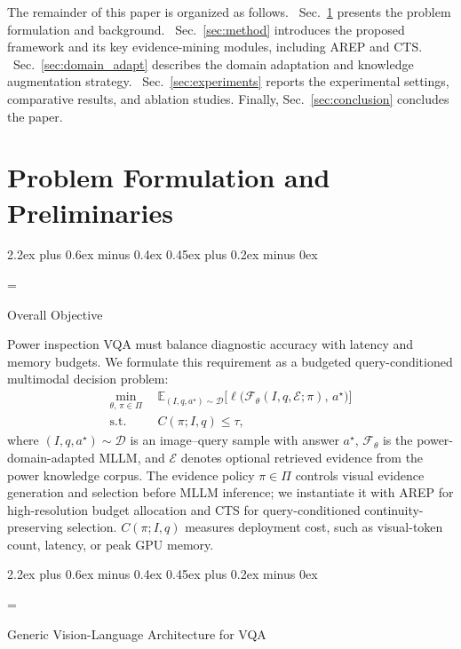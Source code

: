 \documentclass[journal,twoside,web]{ieeecolor}
\makeatletter
\renewcommand{\subsection}{\@startsection{subsection}{2}{\z@}%
  {2.2ex plus 0.6ex minus 0.4ex}%
  {0.45ex plus 0.2ex minus 0ex}%
  {\color{myorange}\normalsize\normalfont\everymath={\sf}\sf\itshape\raggedright}}
\newcommand{\secref}[1]{Sec.~\ref{#1}}
\makeatother
\begin{document}
The remainder of this paper is organized as follows.
~\secref{sec:problem} presents the problem formulation and background.
~\secref{sec:method} introduces the proposed framework and its key evidence-mining modules, including AREP and CTS.
~\secref{sec:domain_adapt} describes the domain adaptation and knowledge augmentation strategy.
~\secref{sec:experiments} reports the experimental settings, comparative results, and ablation studies.
Finally, \secref{sec:conclusion} concludes the paper.

\section{Problem Formulation and Preliminaries}
\label{sec:problem}

\subsection{Overall Objective}
\label{sec:overall_objective}

Power inspection VQA must balance diagnostic accuracy with latency and memory budgets.
We formulate this requirement as a budgeted query-conditioned multimodal decision problem:
\begin{equation}
  \begin{aligned}
    \min_{\theta,\,\pi\in\Pi}\ \ &
    \mathbb{E}_{(I,q,a^\star)\sim\mathcal{D}}
    \Big[\ell\big(\mathcal{F}_{\theta}(I,q,\mathcal{E};\pi),\,a^\star\big)\Big] \\
    \text{s.t.}\ \ &
    C(\pi; I,q) \le \tau,
  \end{aligned}
  \label{eq:overall_obj}
\end{equation}
where $(I,q,a^\star)\sim\mathcal{D}$ is an image--query sample with answer $a^\star$, $\mathcal{F}_{\theta}$ is the power-domain-adapted MLLM, and $\mathcal{E}$ denotes optional retrieved evidence from the power knowledge corpus.
The evidence policy $\pi\in\Pi$ controls visual evidence generation and selection before MLLM inference; we instantiate it with AREP for high-resolution budget allocation and CTS for query-conditioned continuity-preserving selection.
$C(\pi;I,q)$ measures deployment cost, such as visual-token count, latency, or peak GPU memory.

\subsection{Generic Vision-Language Architecture for VQA}
\label{sec:vqa}
\end{document}

